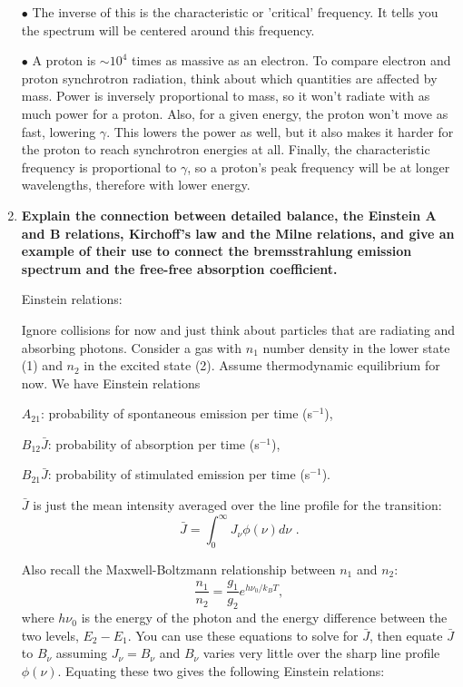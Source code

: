 \begin{enumerate}
      $\bullet$ The inverse of this is the characteristic or 'critical' frequency. It tells you the spectrum will be centered around this frequency.
      
      $\bullet$ A proton is $\sim10^{4}$ times as massive as an electron. To compare electron and proton synchrotron radiation, think about which quantities are affected by mass. Power is inversely proportional to mass, so it won't radiate with as much power for a proton. Also, for a given energy, the proton won't move as fast, lowering $\gamma$. This lowers the power as well, but it also makes it harder for the proton to reach synchrotron energies at all. Finally, the characteristic frequency is proportional to $\gamma$, so a proton's peak frequency will be at longer wavelengths, therefore with lower energy.
      
\item \textbf{Explain the connection between detailed balance, the Einstein A and B relations,
      Kirchoff's law and the Milne relations, and give an example of their use to connect the
      bremsstrahlung emission spectrum and the free-free absorption coefficient.}
      
      Einstein relations:
      
      Ignore collisions for now and just think about particles that are radiating and absorbing photons. Consider a gas with $n_1$ number density in the lower state (1) and $n_2$ in the excited state (2). Assume thermodynamic equilibrium for now. We have Einstein relations
      
      $A_{21}$: probability of spontaneous emission per time (s$^{-1}$),
      
      $B_{12}\bar{J}$: probability of absorption per time (s$^{-1}$),
      
       $B_{21}\bar{J}$: probability of stimulated emission per time (s$^{-1}$).
       
       $\bar{J}$ is just the mean intensity averaged over the line profile for the transition:
       \begin{equation}
       \bar{J} = \int^\infty_0 J_\nu \phi(\nu) d\nu \,\,.
       \end{equation}
       
       Also recall the Maxwell-Boltzmann relationship between $n_1$ and $n_2$:
       \begin{equation}
       \frac{n_1}{n_2} = \frac{g_1}{g_2} e^{h\nu_0 / k_B T},
       \end{equation}
       where $h\nu_0$ is the energy of the photon and the energy difference between the two levels, $E_2 - E_1$. You can use these equations to solve for $\bar{J}$, then equate $\bar{J}$ to $B_\nu$ assuming $J_\nu = B_\nu$ and $B_\nu$ varies very little over the sharp line profile $\phi(\nu)$. Equating these two gives the following Einstein relations:
      

\end{enumerate}
